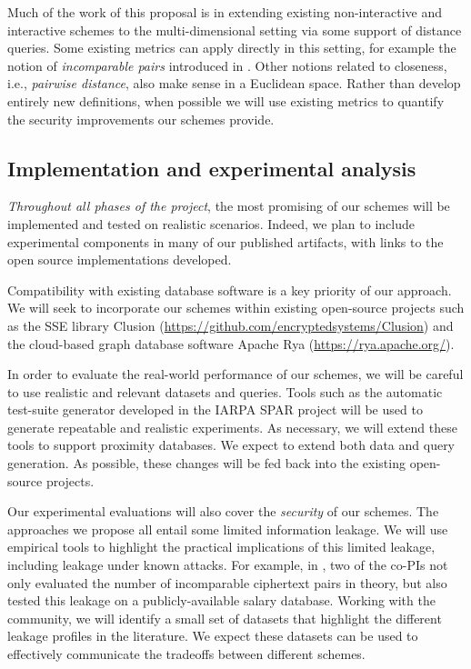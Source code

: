 Much of the work of this proposal is in extending existing
non-interactive and interactive schemes to the multi-dimensional setting
via some support of distance queries. Some existing metrics can apply
directly in this setting, for example the notion of \emph{incomparable
pairs} introduced in \cite{CCS:RACY16}. Other notions related to
closeness, i.e., \emph{pairwise distance}, also make sense in a
Euclidean space. Rather than develop entirely new definitions, when
possible we will use existing metrics to quantify the security
improvements our schemes provide.

\subsection{Implementation and experimental analysis}

\emph{Throughout all phases of the project}, the most promising of our
schemes will be implemented and tested on realistic scenarios.
Indeed, we plan to include
experimental components in many of our published artifacts, with
links to the open source implementations developed.

Compatibility with existing database software is a key priority of
our approach.  We will seek to incorporate our schemes within existing
open-source projects such as the SSE library Clusion
(\url{https://github.com/encryptedsystems/Clusion}) and
the cloud-based graph database software
Apache Rya (\url{https://rya.apache.org/}).

In order to evaluate the real-world performance of our schemes, we will
be careful to use realistic and relevant datasets and queries. Tools
such as the automatic test-suite generator developed in the IARPA SPAR
project \cite{HH14,varia2015automated} will be used to generate
repeatable and realistic experiments.  As necessary, we will extend these tools to support proximity databases.  We expect to extend both data and query generation.  As possible, these changes will be fed back into the existing open-source projects.

Our experimental evaluations will also cover the \emph{security} of our
schemes. The approaches we propose all
entail some limited information leakage.
We will use empirical tools to highlight the practical
implications of this limited leakage, including leakage under known
attacks. For example, in \cite{CCS:RACY16}, two of the co-PIs not only
evaluated the number of incomparable ciphertext pairs in theory, but
also tested this leakage on a publicly-available salary database.  Working with the community, we will identify a small set of datasets that highlight the different leakage profiles in the literature.  We expect these datasets can be used to effectively communicate the tradeoffs between different schemes.
